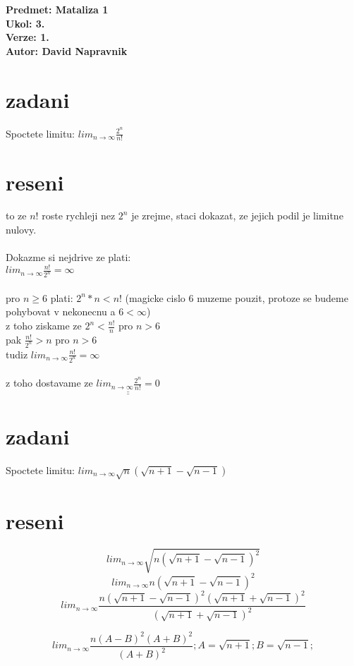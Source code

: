 \documentclass[a4paper]{article}
\def\doubleunderline#1{\underline{\underline{#1}}}
\begin{document}
\noindent
\textbf{Predmet: Mataliza 1}\\
\textbf{Ukol: 3.}\\
\textbf{Verze: 1.}\\
\textbf{Autor: David Napravnik}

\section*{zadani}
Spoctete limitu: 
$lim_{n\rightarrow \infty}\frac{2^n}{n!}$

\section*{reseni}
to ze $n!$ roste rychleji nez $2^n$ je zrejme, 
staci dokazat, ze jejich podil je limitne nulovy.\\
\\
Dokazme si nejdrive ze plati: \\
$lim_{n\rightarrow \infty}\frac{n!}{2^n} = \infty$ \\
\\
pro $n\geq6$ plati: $2^n * n < n!$
(magicke cislo 6 muzeme pouzit, protoze se budeme pohybovat v nekonecnu a $6<\infty$)\\
z toho ziskame ze $2^n < \frac{n!}{n}$ pro $n>6$\\
pak $\frac{n!}{2^n} > n$ pro $n>6$\\
tudiz 
$lim_{n\rightarrow \infty}\frac{n!}{2^n} = \infty$\\
\\
z toho dostavame ze
$\doubleunderline{lim_{n\rightarrow \infty}\frac{2^n}{n!} = 0}$


\section*{zadani}
Spoctete limitu: 
$lim_{n\rightarrow \infty} \sqrt{n}\left( \sqrt{n+1} - \sqrt{n-1} \right)$

\section*{reseni}
$$
lim_{n\rightarrow \infty} \sqrt{n \left( \sqrt{n+1} - \sqrt{n-1} \right)^2}
$$
$$
lim_{n\rightarrow \infty}
n \left( \sqrt{n+1} - \sqrt{n-1} \right)^2
$$
$$
lim_{n\rightarrow \infty}
\frac
{
	n
	\left(\sqrt{n+1} - \sqrt{n-1}\right)^2
	\left(\sqrt{n+1} + \sqrt{n-1}\right)^2
}
{\left(\sqrt{n+1} + \sqrt{n-1}\right)^2}
$$

$$
lim_{n\rightarrow \infty}
\frac
{n (A - B)^2 (A + B)^2}
{(A + B)^2};
A=\sqrt{n+1};
B=\sqrt{n-1};
$$
\end{document}
